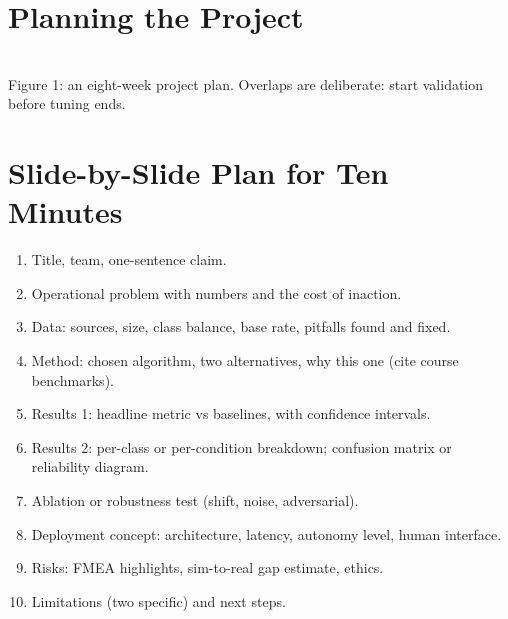 \documentclass[11pt]{article}
\begin{document}
\section{Planning the Project}
\begin{center}\\{\small\color{GreyN}Figure 1: an eight-week project plan. Overlaps are deliberate: start validation before tuning ends.}\end{center}

\section{Slide-by-Slide Plan for Ten Minutes}
\begin{enumerate}
\item Title, team, one-sentence claim.
\item Operational problem with numbers and the cost of inaction.
\item Data: sources, size, class balance, base rate, pitfalls found and fixed.
\item Method: chosen algorithm, two alternatives, why this one (cite course benchmarks).
\item Results 1: headline metric vs baselines, with confidence intervals.
\item Results 2: per-class or per-condition breakdown; confusion matrix or reliability diagram.
\item Ablation or robustness test (shift, noise, adversarial).
\item Deployment concept: architecture, latency, autonomy level, human interface.
\item Risks: FMEA highlights, sim-to-real gap estimate, ethics.
\item Limitations (two specific) and next steps.
\end{enumerate}
\end{document}
